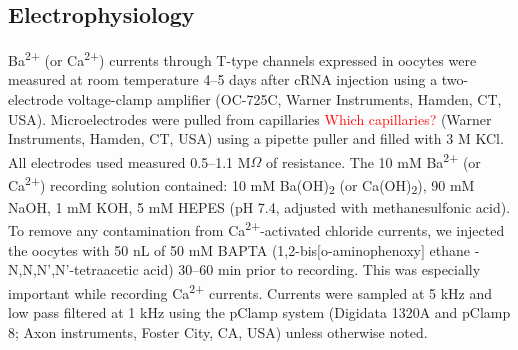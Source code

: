 \subsection*{Electrophysiology}

Ba\textsuperscript{2+} (or Ca\textsuperscript{2+}) currents through T-type channels expressed in oocytes were measured at room temperature 4--5 days after cRNA injection using a two-electrode voltage-clamp amplifier (OC-725C, Warner Instruments, Hamden, CT, USA).
Microelectrodes were pulled from capillaries \textcolor{red}{Which capillaries?} (Warner Instruments, Hamden, CT, USA) using a pipette puller and filled with 3 M KCl.
All electrodes used measured 0.5--1.1 M$\Omega$ of resistance.
The 10 mM Ba\textsuperscript{2+} (or Ca\textsuperscript{2+}) recording solution contained: 10 mM Ba(OH)\textsubscript{2} (or Ca(OH)\textsubscript{2}), 90 mM NaOH, 1 mM KOH, 5 mM HEPES (pH 7.4, adjusted with methanesulfonic acid).
To remove any contamination from Ca\textsuperscript{2+}-activated chloride currents, we injected the oocytes with 50 nL of 50 mM BAPTA (1,2-bis$[$o-aminophenoxy$]$ ethane -N,N,N\textquoteright,N\textquoteright-tetraacetic acid) 30--60 min prior to recording.
This was especially important while recording Ca\textsuperscript{2+} currents.
Currents were sampled at 5 kHz and low pass filtered at 1 kHz using the pClamp system (Digidata 1320A and pClamp 8; Axon instruments, Foster City, CA, USA) unless otherwise noted. 

